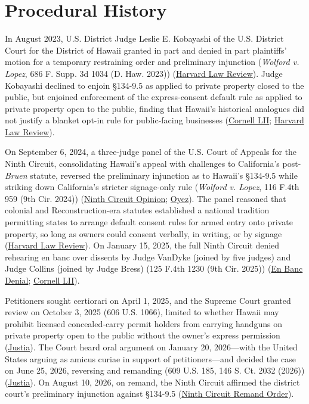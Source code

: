 \documentclass[12pt]{article}
\begin{document}
\section{Procedural History}
In August 2023, U.S. District Judge Leslie E. Kobayashi of the U.S. District Court for the District of Hawaii granted in part and denied in part plaintiffs' motion for a temporary restraining order and preliminary injunction (\textit{Wolford v. Lopez}, 686 F. Supp. 3d 1034 (D. Haw. 2023)) (\href{https://harvardlawreview.org/print/vol-140/wolford-v-lopez/}{Harvard Law Review}). Judge Kobayashi declined to enjoin \S{}134-9.5 as applied to private property closed to the public, but enjoined enforcement of the express-consent default rule as applied to private property open to the public, finding that Hawaii's historical analogues did not justify a blanket opt-in rule for public-facing businesses (\href{https://www.law.cornell.edu/supremecourt/text/24-1046}{Cornell LII}; \href{https://harvardlawreview.org/print/vol-140/wolford-v-lopez/}{Harvard Law Review}).

On September 6, 2024, a three-judge panel of the U.S. Court of Appeals for the Ninth Circuit, consolidating Hawaii's appeal with challenges to California's post-\textit{Bruen} statute, reversed the preliminary injunction as to Hawaii's \S{}134-9.5 while striking down California's stricter signage-only rule (\textit{Wolford v. Lopez}, 116 F.4th 959 (9th Cir. 2024)) (\href{https://cdn.ca9.uscourts.gov/datastore/opinions/2024/09/06/23-16164.pdf}{Ninth Circuit Opinion}; \href{https://www.oyez.org/cases/2025/24-1046}{Oyez}). The panel reasoned that colonial and Reconstruction-era statutes established a national tradition permitting states to arrange default consent rules for armed entry onto private property, so long as owners could consent verbally, in writing, or by signage (\href{https://harvardlawreview.org/print/vol-140/wolford-v-lopez/}{Harvard Law Review}). On January 15, 2025, the full Ninth Circuit denied rehearing en banc over dissents by Judge VanDyke (joined by five judges) and Judge Collins (joined by Judge Bress) (125 F.4th 1230 (9th Cir. 2025)) (\href{https://cdn.ca9.uscourts.gov/datastore/opinions/2025/01/15/23-16164.pdf}{En Banc Denial}; \href{https://www.law.cornell.edu/supremecourt/text/24-1046}{Cornell LII}).

Petitioners sought certiorari on April 1, 2025, and the Supreme Court granted review on October 3, 2025 (606 U.S. 1066), limited to whether Hawaii may prohibit licensed concealed-carry permit holders from carrying handguns on private property open to the public without the owner's express permission (\href{https://supreme.justia.com/cases/federal/us/609/24-1046/}{Justia}). The Court heard oral argument on January 20, 2026---with the United States arguing as amicus curiae in support of petitioners---and decided the case on June 25, 2026, reversing and remanding (609 U.S. 185, 146 S. Ct. 2032 (2026)) (\href{https://supreme.justia.com/cases/federal/us/609/24-1046/}{Justia}). On August 10, 2026, on remand, the Ninth Circuit affirmed the district court's preliminary injunction against \S{}134-9.5 (\href{https://cdn.ca9.uscourts.gov/datastore/opinions/2026/08/10/23-16164.pdf}{Ninth Circuit Remand Order}).
\end{document}
